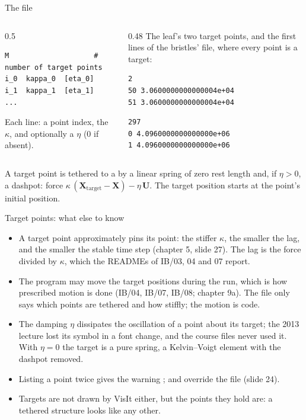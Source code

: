 \documentclass[aspectratio=169,11pt]{beamer}
\begin{document}
\begin{frame}[fragile]{The  file}
\begin{columns}[T,onlytextwidth]
\begin{column}{0.5\textwidth}
\begin{lstlisting}[style=data]
M                    # number of target points
i_0  kappa_0  [eta_0]
i_1  kappa_1  [eta_1]
...
\end{lstlisting}
\small Each line: a point index, the  $\kappa$, and optionally a  $\eta$ (0 if absent).
\end{column}
\begin{column}{0.48\textwidth}
\small The leaf's two target points, and the first lines of the bristles' file, where every point is a target:
\begin{lstlisting}[style=tiny]
2
50 3.0600000000000004e+04
51 3.0600000000000004e+04
\end{lstlisting}
\begin{lstlisting}[style=tiny]
297
0 4.0960000000000000e+06
1 4.0960000000000000e+06
\end{lstlisting}
\end{column}
\end{columns}
\vspace{2mm}
\small A target point is tethered to a  by a linear spring of zero rest length and, if $\eta > 0$, a dashpot: force $\kappa\,(\mathbf{X}_{\text{target}} - \mathbf{X}) - \eta\,\mathbf{U}$. The target position starts at the point's initial position.
\end{frame}

\begin{frame}{Target points: what else to know}
\begin{itemize}
  \item A target point approximately pins its point: the stiffer $\kappa$, the smaller the lag, and the smaller the stable time step (chapter 5, slide 27). The lag is the force divided by $\kappa$, which the READMEs of IB/03, 04 and 07 report.
  \item The program may move the target positions during the run, which is how prescribed motion is done (IB/04, IB/07, IB/08; chapter 9a). The file only says which points are tethered and how stiffly; the motion is code.
  \item The damping $\eta$ dissipates the oscillation of a point about its target; the 2013 lecture lost its symbol in a font change, and the course files never used it. With $\eta = 0$ the target is a pure spring, a Kelvin--Voigt element with the dashpot removed.
  \item Listing a point twice gives the warning ;  and  override the file (slide 24).
  \item Targets are not drawn by VisIt either, but the points they hold are: a tethered structure looks like any other.
\end{itemize}
\end{frame}
\end{document}
